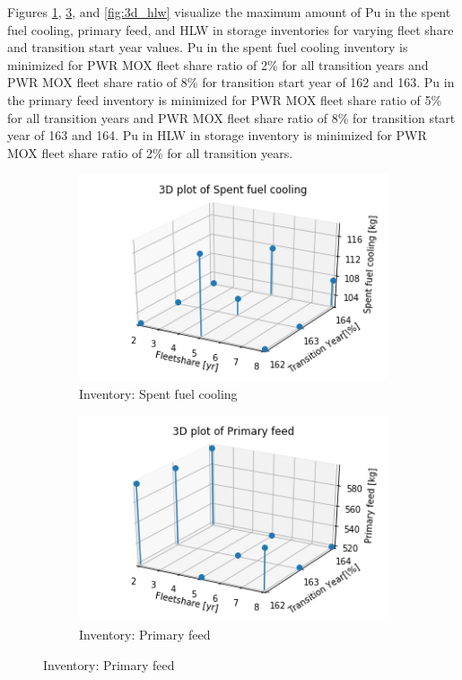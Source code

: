 Figures \ref{fig:3d_sfc}, \ref{fig:3d_pf}, and \ref{fig:3d_hlw}
visualize the maximum amount of Pu in the spent fuel cooling, 
primary feed, and \gls{HLW} in storage inventories for varying 
fleet share and transition start year values. 
Pu in the spent fuel cooling inventory is minimized for PWR MOX
fleet share ratio of 2\% for all transition years
and PWR MOX fleet share ratio of 8\% for 
transition start year of 162 and 163.  
Pu in the primary feed inventory is minimized for PWR MOX
fleet share ratio of 5\% for all transition years and PWR MOX 
fleet share ratio of 8\% for 
transition start year of 163 and 164.                       
Pu in HLW in storage inventory is minimized for PWR MOX
fleet share ratio of 2\% for all transition years. 

\begin{figure}[H]
    \centering
    \begin{subfigure}[t]{\textwidth}
    \centering
        \includegraphics[width=0.4\linewidth]{figures/3d_sfc} 
        \caption{Inventory: Spent fuel cooling}
        \label{fig:3d_sfc}
    \end{subfigure}
    \begin{subfigure}[t]{0.4\textwidth}
        \centering
        \includegraphics[width=\linewidth]{figures/3d_pf} 
        \caption{Inventory: Primary feed}
	    \label{fig:3d_pf}

\end{subfigure}
\end{figure}
